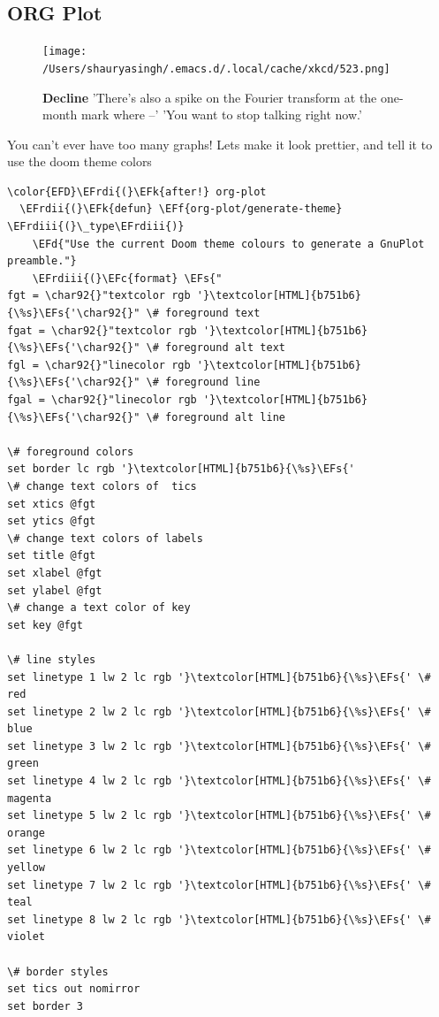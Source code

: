\documentclass{scrartcl}
\newcommand{\EFk}[1]{\textcolor{EFk}{#1}} %
\newcommand{\EFd}[1]{\textcolor{EFd}{\textit{#1}}} %
\newcommand{\EFs}[1]{\textcolor{EFs}{#1}} %
\newcommand{\EFc}[1]{\textcolor{EFc}{#1}} %
\newcommand{\EFf}[1]{\textcolor{EFf}{#1}} %
\newcommand{\EFrdi}[1]{\textcolor{EFrdi}{#1}} %
\newcommand{\EFrdii}[1]{\textcolor{EFrdii}{#1}} %
\newcommand{\EFrdiii}[1]{\textcolor{EFrdiii}{#1}} %
\begin{document}
\subsection{ORG Plot}
\label{sec:orgf783397}

\begin{figure}[!htb]
	  \centering
	  \texttt{[image: /Users/shauryasingh/.emacs.d/.local/cache/xkcd/523.png]}
  \caption*{\label{xkcd:523} \textbf{Decline} 'There's also a spike on the Fourier transform at the one-month mark where --' 'You want to stop talking right now.'}
	\end{figure}

You can't ever have too many graphs! Lets make it look prettier, and tell it to use the doom theme colors
\begin{Code}
\begin{Verbatim}[]
\color{EFD}\EFrdi{(}\EFk{after!} org-plot
  \EFrdii{(}\EFk{defun} \EFf{org-plot/generate-theme} \EFrdiii{(}\_type\EFrdiii{)}
    \EFd{"Use the current Doom theme colours to generate a GnuPlot preamble."}
    \EFrdiii{(}\EFc{format} \EFs{"
fgt = \char92{}"textcolor rgb '}\textcolor[HTML]{b751b6}{\%s}\EFs{'\char92{}" \# foreground text
fgat = \char92{}"textcolor rgb '}\textcolor[HTML]{b751b6}{\%s}\EFs{'\char92{}" \# foreground alt text
fgl = \char92{}"linecolor rgb '}\textcolor[HTML]{b751b6}{\%s}\EFs{'\char92{}" \# foreground line
fgal = \char92{}"linecolor rgb '}\textcolor[HTML]{b751b6}{\%s}\EFs{'\char92{}" \# foreground alt line

\# foreground colors
set border lc rgb '}\textcolor[HTML]{b751b6}{\%s}\EFs{'
\# change text colors of  tics
set xtics @fgt
set ytics @fgt
\# change text colors of labels
set title @fgt
set xlabel @fgt
set ylabel @fgt
\# change a text color of key
set key @fgt

\# line styles
set linetype 1 lw 2 lc rgb '}\textcolor[HTML]{b751b6}{\%s}\EFs{' \# red
set linetype 2 lw 2 lc rgb '}\textcolor[HTML]{b751b6}{\%s}\EFs{' \# blue
set linetype 3 lw 2 lc rgb '}\textcolor[HTML]{b751b6}{\%s}\EFs{' \# green
set linetype 4 lw 2 lc rgb '}\textcolor[HTML]{b751b6}{\%s}\EFs{' \# magenta
set linetype 5 lw 2 lc rgb '}\textcolor[HTML]{b751b6}{\%s}\EFs{' \# orange
set linetype 6 lw 2 lc rgb '}\textcolor[HTML]{b751b6}{\%s}\EFs{' \# yellow
set linetype 7 lw 2 lc rgb '}\textcolor[HTML]{b751b6}{\%s}\EFs{' \# teal
set linetype 8 lw 2 lc rgb '}\textcolor[HTML]{b751b6}{\%s}\EFs{' \# violet

\# border styles
set tics out nomirror
set border 3


\end{Verbatim}
\end{Code}
\end{document}
